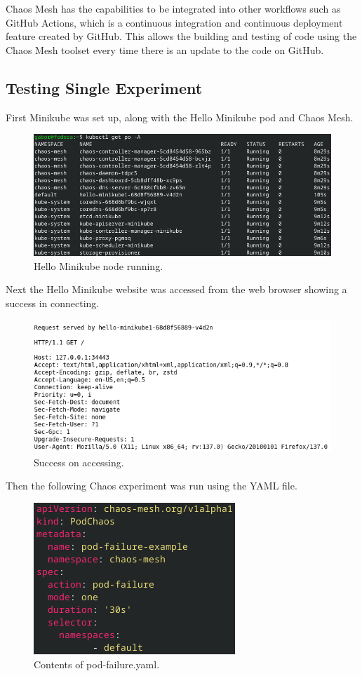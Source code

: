 \documentclass[conference]{IEEEtran}
\begin{document}
Chaos Mesh has the capabilities to be integrated into other workflows such as GitHub Actions, which is a continuous integration and continuous deployment feature created by GitHub. This allows the building and testing of code using the Chaos Mesh toolset every time there is an update to the code on GitHub. \cite{b5}

\subsection{Testing Single Experiment}

First Minikube was set up, along with the Hello Minikube pod and Chaos Mesh.

\begin{figure}
	\centering
	\includegraphics[width=0.7\linewidth]{hello_minikube_running}
	\caption{Hello Minikube node running.}
	\label{fig:hellominikuberunning}
\end{figure}

Next the Hello Minikube website was accessed from the web browser showing a success in connecting.

\begin{figure}
	\centering
	\includegraphics[width=0.8\linewidth]{hello_minikube_result}
	\caption{Success on accessing.}
	\label{fig:hellominikuberesult}
\end{figure}

Then the following Chaos experiment was run using the YAML file.

\begin{figure}
	\centering
	\includegraphics[width=0.6\linewidth]{pod_failure}
	\caption{Contents of pod-failure.yaml.}
	\label{fig:podfailure}
\end{figure}
\end{document}
